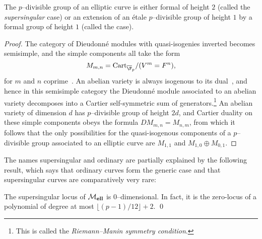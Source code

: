 \begin{lemma}
The \(p\)--divisible group of an elliptic curve is either formal of height \(2\) (called the \textit{supersingular} case) or an extension of an \'etale \(p\)--divisible group of height \(1\) by a formal group of height \(1\) (called the  case).
\end{lemma}
\begin{proof}
The category of Dieudonn\'e modules with quasi-isogenies inverted becomes semisimple, and the simple components all take the form \[M_{m, n} = \Cart_{\overline{\F}_p} / (V^m = F^n),\] for \(m\) and \(n\) coprime~\cite{Manin}.  An abelian variety is always isogenous to its dual~\cite[Section 7]{Milne}, and hence in this semisimple category the Dieudonn\'e module associated to an abelian variety decomposes into a Cartier self-symmetric sum of generators.\footnote{This is called the \textit{Riemann--Manin symmetry condition}.}  An abelian variety of dimension \(d\) has \(p\)--divisible group of height \(2d\), and Cartier duality on these simple components obeys the formula \(DM_{m,n} = M_{n,m}\), from which it follows that the only possibilities for the quasi-isogenous components of a \(p\)--divisible group associated to an elliptic curve are \(M_{1,1}\) and \(M_{1,0} \oplus M_{0,1}\).
\end{proof}

The names supersingular and ordinary are partially explained by the following result, which says that ordinary curves form the generic case and that supersingular curves are comparatively very rare:

\begin{lemma}
The supersingular locus of \(\mathcal{M}_{\mathbf{ell}}\) is \(0\)--dimensional.  In fact, it is the zero-locus of a polynomial of degree at most \(\lfloor (p-1)/12 \rfloor + 2\). \qed
\end{lemma}

